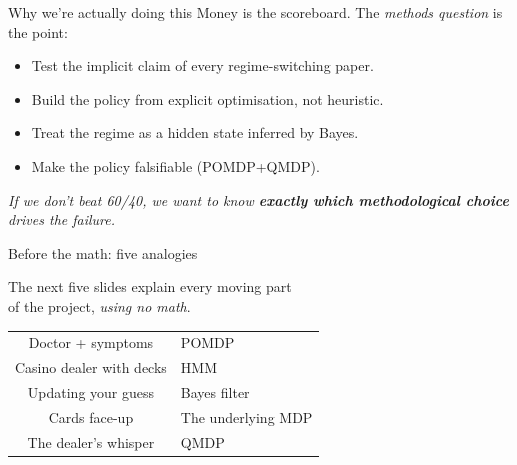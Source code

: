\documentclass[11pt,aspectratio=169]{beamer}
\begin{document}
\begin{frame}{Why we're actually doing this}
Money is the scoreboard. The \emph{methods question} is the point:

\bigskip
\begin{itemize}\setlength{\itemsep}{6pt}
  \item Test the implicit claim of every regime-switching paper.
  \item Build the policy from \alert{explicit optimisation}, not heuristic.
  \item Treat the regime as a \alert{hidden state} inferred by Bayes.
  \item Make the policy \alert{falsifiable} (POMDP+QMDP).
\end{itemize}

\bigskip
\begin{center}
\textit{If we don't beat 60/40, we want to know \textbf{exactly which methodological choice} drives the failure.}
\end{center}
\end{frame}


\begin{frame}{Before the math: five analogies}
\begin{center}
\bigskip
{\Large The next five slides explain every moving part}\\[4pt]
{\Large of the project, \emph{using no math}.}

\bigskip\bigskip
\begin{tabular}{c@{\quad$\to$\quad}l}
  Doctor + symptoms       & POMDP\\
  Casino dealer with decks & HMM \\
  Updating your guess     & Bayes filter \\
  Cards face-up           & The underlying MDP \\
  The dealer's whisper    & QMDP \\
\end{tabular}
\end{center}
\end{frame}
\end{document}
